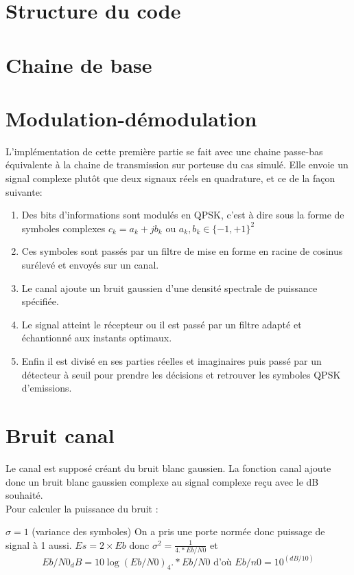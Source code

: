 \documentclass[a4paper,11pt]{article}
\newcommand{\ds}{\displaystyle}
\begin{document}
\section{Structure du code}

\section{Chaine de base}



\section{Modulation-démodulation}
L'implémentation de cette première partie se fait avec une chaine passe-bas équivalente à la chaine de transmission sur porteuse du cas simulé. Elle envoie un signal complexe plutôt que deux signaux réels en quadrature, et ce de la façon suivante:
\begin{enumerate}
	\item Des bits d'informations sont modulés en QPSK, c'est à dire sous la forme de symboles complexes $c_k=a_k+jb_k$ ou $a_k,b_k \in \{-1,+1\}^2$
	\item Ces symboles sont passés par un filtre de mise en forme en racine de cosinus surélevé et envoyés sur un canal.
	\item Le canal ajoute un bruit gaussien d'une densité spectrale de puissance spécifiée.
	\item Le signal atteint le récepteur ou il est passé par un filtre adapté et échantionné aux instants optimaux.
	\item Enfin il est divisé en ses parties réelles et imaginaires puis passé par un détecteur à seuil pour prendre les décisions et retrouver les symboles QPSK d'emissions.
\end{enumerate}


\section{Bruit canal}
Le canal est supposé créant du bruit blanc gaussien. La fonction canal ajoute donc un bruit blanc gaussien complexe au signal complexe reçu avec le dB souhaité. \\
Pour calculer la puissance du bruit : 

$\sigma = 1$ (variance des symboles)
On a pris une porte normée donc puissage de signal à 1 aussi.
$Es=2 \times Eb$  donc $\ds \sigma^2 = \frac{1}{4.*Eb/N0}$
et $$Eb/N0_dB = 10\log(Eb/N0) _4.*Eb/N0 \text{ d'où } Eb/n0 = 10^{(dB/10)}$$
\end{document}
